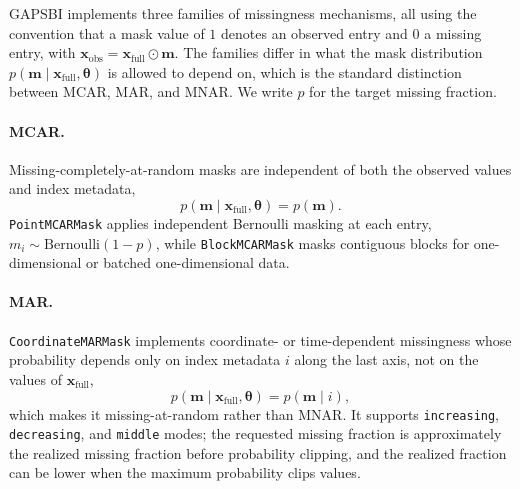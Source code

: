 \documentclass{article} %
\providecommand{\xfull}{\mathbf{x}_{\mathrm{full}}}
\providecommand{\xobs}{\mathbf{x}_{\mathrm{obs}}}
\providecommand{\mvec}{\mathbf{m}}
\providecommand{\thetab}{\boldsymbol{\theta}}
\begin{document}
GAPSBI implements three families of missingness mechanisms, all using the
convention that a mask value of $1$ denotes an observed entry and $0$ a missing
entry, with $\xobs = \xfull \odot \mvec$. The families differ in what the mask
distribution $p(\mvec \mid \xfull, \thetab)$ is allowed to depend on, which is the
standard distinction between MCAR, MAR, and MNAR. We write $p$ for the target
missing fraction.

\paragraph{MCAR.} Missing-completely-at-random masks are independent of both the
observed values and index metadata,
\begin{equation}
  p(\mvec \mid \xfull, \thetab) = p(\mvec).
  \label{eq:mcar}
\end{equation}
\texttt{PointMCARMask} applies independent Bernoulli masking at each entry,
$m_i \sim \mathrm{Bernoulli}(1 - p)$, while \texttt{BlockMCARMask} masks
contiguous blocks for one-dimensional or batched one-dimensional data.

\paragraph{MAR.} \texttt{CoordinateMARMask} implements coordinate- or
time-dependent missingness whose probability depends only on index metadata $i$
along the last axis, not on the values of $\xfull$,
\begin{equation}
  p(\mvec \mid \xfull, \thetab) = p(\mvec \mid i),
  \label{eq:mar}
\end{equation}
which makes it missing-at-random rather than MNAR. It supports
\texttt{increasing}, \texttt{decreasing}, and \texttt{middle} modes; the requested
missing fraction is approximately the realized missing fraction before probability
clipping, and the realized fraction can be lower when the maximum probability
clips values.
\end{document}
